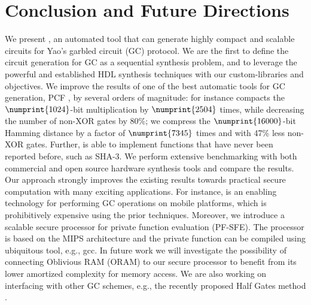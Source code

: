 \chapter{Conclusion and Future Directions}\label{chap:conc}
We present \sys{}, an automated tool that can generate highly compact and scalable circuits for Yao's garbled circuit (GC) protocol.
We are the first to define the circuit generation for GC as a sequential synthesis problem, and to leverage the powerful and established HDL synthesis techniques with our custom-libraries and objectives.
We improve the results of one of the best automatic tools for GC generation, PCF \cite{kreuter2013pcf}, by several orders of magnitude: for instance \sys{} compacts the $\numprint{1024}$-bit multiplication by $\numprint{2504}$ times, while decreasing the number of non-XOR gates by 80\%; we compress the $\numprint{16000}$-bit Hamming distance by a factor of $\numprint{7345}$ times and with 47\% less non-XOR gates.
Further, \sys{} is able to implement functions that have never been reported before, such as SHA-3.
We perform extensive benchmarking with both commercial and open source hardware synthesis tools and compare the results.
Our approach strongly improves the existing results towards practical secure computation with many exciting applications.
For instance, \sys{} is an enabling technology for performing GC operations on mobile platforms, which is prohibitively expensive using the prior techniques.
Moreover, we introduce a scalable secure processor for private function evaluation (PF-SFE).
The processor is based on the MIPS architecture and the private function can be compiled using ubiquitous tool, e.g., gcc.
In future work we will investigate the possibility of connecting Oblivious RAM (ORAM) to our secure processor to benefit from its lower amortized complexity for memory access.
We are also working on interfacing \sys{} with other GC schemes, e.g., the recently proposed Half Gates method \cite{zahur2014two}.
